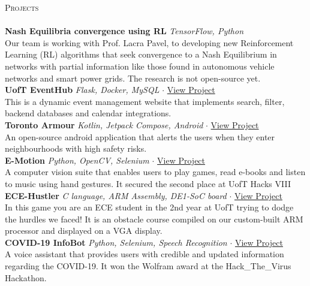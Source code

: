 \documentclass[a4paper]{article}
\newcommand{\lineunder} {
    \vspace*{-8pt} \\
    \hspace*{-18pt} \hrulefill \\
}
\newcommand{\header} [1] {
    {\hspace*{-18pt}\vspace*{6pt} \textsc{#1}}
    \vspace*{-6pt} \lineunder
}
\begin{document}
\header{Projects}
{\textbf{Nash Equilibria convergence using RL}} {\sl TensorFlow, Python} \\
Our team is working with Prof. Lacra Pavel, to developing new Reinforcement Learning (RL) algorithms that seek convergence to a Nash Equilibrium in networks
 with partial information like those found in autonomous vehicle networks and smart power grids. The research is not open-source yet.\\
\vspace*{2mm}
{\textbf{UofT EventHub}} {\sl Flask, Docker, MySQL} $\cdot$ \href{https://netninjahub.onrender.com/}{View Project}\\
This is a dynamic event management website that implements search, filter, backend databases and calendar integrations. \\
\vspace*{2mm}
{\textbf{Toronto Armour}} {\sl Kotlin, Jetpack Compose, Android} $\cdot$ \href{https://github.com/pandyah5/TorontoArmour}{View Project} \\
An open-source android application that alerts the users when they enter neighbourhoods with high safety risks.\\
\vspace*{2mm}
{\textbf{E-Motion}} {\sl Python, OpenCV, Selenium} $\cdot$ \href{https://devpost.com/software/e-motion-otbl2i}{View Project} \\
A computer vision suite that enables users to play games, read e-books and listen to music using hand gestures. It secured the second place at UofT Hacks VIII\\
\vspace*{2mm}
{\textbf{ECE-Hustler}} {\sl C language, ARM Assembly, DE1-SoC board} $\cdot$ \href{https://github.com/pandyah5/ECE-Hustler}{View Project} \\
In this game you are an ECE student in the 2nd year at UofT trying to dodge the hurdles we faced! It is an obstacle course compiled on our custom-built ARM processor and displayed on a VGA display.\\
\vspace*{2mm}
{\textbf{COVID-19 InfoBot}} {\sl Python, Selenium, Speech Recognition} $\cdot$ \href{https://devpost.com/software/covid-19-infobot}{View Project} \\
A voice assistant that provides users with credible and updated information regarding the COVID-19. It won the Wolfram award at the Hack\_The\_Virus Hackathon.\\
\vspace*{2mm}
\end{document}
